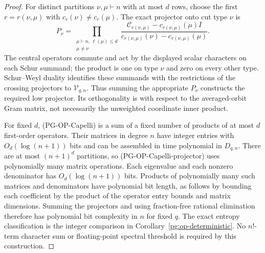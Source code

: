 \begin{proof}
For distinct partitions $\nu,\mu\vdash n$ with at most $d$ rows, choose
the first $r=r(\nu,\mu)$ with $c_r(\nu)\ne c_r(\mu)$. The exact
projector onto cut type $\nu$ is
\[
 P_\nu=
 \prod_{\substack{\mu\vdash n,\,\ell(\mu)\leq d\\\mu\ne\nu}}
 \frac{\mathcal C_{r(\nu,\mu)}-c_{r(\nu,\mu)}(\mu)I}
      {c_{r(\nu,\mu)}(\nu)-c_{r(\nu,\mu)}(\mu)}.
 \tag{PG-OP-Capelli-projector}
\]
The central operators commute and act by the displayed scalar
characters on each Schur summand; the product is one on type $\nu$
and zero on every other type. Schur--Weyl duality identifies these
summands with the restrictions of the crossing projectors to
$\mathcal V_{q,n}$. Thus summing the appropriate $P_\nu$ constructs the
required low projector. Its orthogonality is with respect to the
averaged-orbit Gram matrix, not necessarily the unweighted coordinate
inner product.

For fixed $d$, (PG-OP-Capelli) is a sum of a fixed number of products of
at most $d$ first-order operators. Their matrices in degree $n$ have
integer entries with $O_d(\log(n+1))$ bits and can be assembled in time
polynomial in $D_{q,n}$. There are at most $(n+1)^d$ partitions, so
(PG-OP-Capelli-projector) uses polynomially many matrix operations.
Each eigenvalue and each nonzero denominator has $O_d(\log(n+1))$
bits. Products of polynomially many such matrices and denominators have
polynomial bit length, as follows by bounding each coefficient by the
product of the operator entry bounds and matrix dimensions. Summing
the projectors and using fraction-free rational elimination therefore
has polynomial bit complexity in $n$ for fixed $q$. The exact entropy
classification is the integer comparison in
Corollary~\ref{pg:op-deterministic}. No $n!$-term character sum or
floating-point spectral threshold is required by this construction.
\end{proof}


